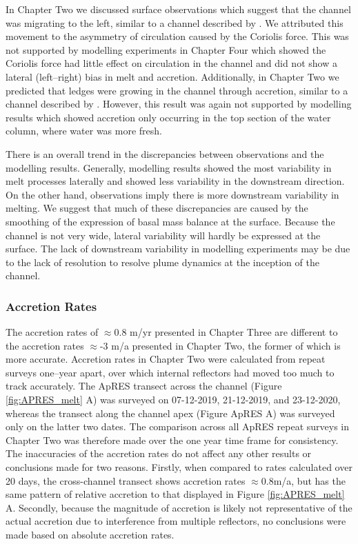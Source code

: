In Chapter Two we discussed surface observations which suggest that the channel was migrating to the left, similar to a channel described by \cite{chartrand2020basal}. We attributed this movement to the asymmetry of circulation caused by the Coriolis force. This was not supported by modelling experiments in Chapter Four which showed the Coriolis force had little effect on circulation in the channel and did not show a lateral (left--right) bias in melt and accretion. Additionally, in Chapter Two we predicted that ledges were growing in the channel through accretion, similar to a channel described by \cite{dutrieux2014basal}. However, this result was again not supported by modelling results which showed accretion only occurring in the top section of the water column, where water was more fresh.

There is an overall trend in the discrepancies between observations and the modelling results. Generally, modelling results showed the most variability in melt processes laterally and showed less variability in the downstream direction. On the other hand, observations imply there is more downstream variability in melting.
We suggest that much of these discrepancies are caused by the smoothing of the expression of basal mass balance at the surface. Because the channel is not very wide, lateral variability will hardly be expressed at the surface. The lack of downstream variability in modelling experiments may be due to the lack of resolution to resolve plume dynamics at the inception of the channel.

\subsubsection{Accretion Rates}

The accretion rates of $\approx$0.8 m/yr presented in Chapter Three are different to the accretion rates $\approx$-3 m/a presented in Chapter Two, the former of which is more accurate. Accretion rates in Chapter Two were calculated from repeat surveys one--year apart, over which internal reflectors had moved too much to track accurately. The ApRES transect across the channel (Figure \ref{fig:APRES_melt} A) was surveyed on 07-12-2019, 21-12-2019, and 23-12-2020, whereas the transect along the channel apex (Figure ApRES A) was surveyed only on the latter two dates. The comparison across all ApRES repeat surveys in Chapter Two was therefore made over the one year time frame for consistency.  The inaccuracies of the accretion rates do not affect any other results or conclusions made for two reasons. Firstly, when compared to rates calculated over 20 days, the cross-channel transect shows accretion rates $\approx$0.8m/a, but has the same pattern of relative accretion to that displayed in Figure \ref{fig:APRES_melt} A.  Secondly, because the magnitude of accretion is likely not representative of the actual accretion due to interference from multiple reflectors, no conclusions were made based on absolute accretion rates.



